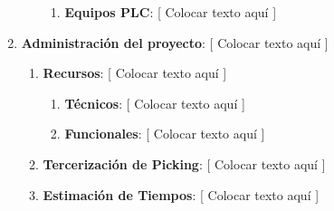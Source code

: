 \documentclass{article}
\begin{document}
\begin{enumerate}
\begin{enumerate}[label*=\arabic*.]
\begin{enumerate}[label*=\arabic*.]
						\item \textbf{Equipos PLC}: [ Colocar texto aquí ]

					\end{enumerate}

			\end{enumerate}

		\item \textbf{Administración del proyecto}: [ Colocar texto aquí ]

			\begin{enumerate}[label*=\arabic*.]

				\item \textbf{Recursos}: [ Colocar texto aquí ]

					\begin{enumerate}[label*=\arabic*.]
						\itemsep=3pt \topsep=0pt \partopsep=0pt \parskip=0pt \parsep=0pt

						\item \textbf{Técnicos}: [ Colocar texto aquí ]

						\item \textbf{Funcionales}: [ Colocar texto aquí ]

					\end{enumerate}
			
				\item \textbf{Tercerización de Picking}: [ Colocar texto aquí ]

				\item \textbf{Estimación de Tiempos}: [ Colocar texto aquí ]

			\end{enumerate}

	\end{enumerate}
	\medskip

\bigskip





\end{document}
